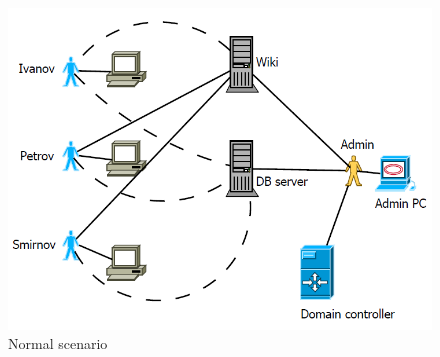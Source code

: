 \begin{figure}[ht!]
\centering
\includegraphics[width=\columnwidth]{figures/scenario_normal.png}
\caption{Normal scenario}
\label{overflow}
\end{figure}

